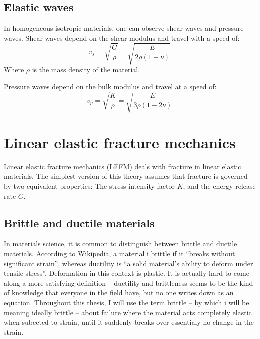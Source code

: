 \subsection{Elastic waves}
In homogeneous isotropic materials, one can observe shear waves and pressure waves. Shear waves depend on the shear modulus and travel with a speed of:
\begin{equation}
	v_s = \sqrt{\frac{G}{\rho}} = \sqrt{\frac{E}{2\rho(1+\nu)}}
\end{equation}
Where $\rho$ is the mass density of the material.

Pressure waves depend on the bulk modulus and travel at a speed of:
\begin{equation}
	v_p = \sqrt{\frac{K}{\rho}} = \sqrt{\frac{E}{3\rho(1-2\nu)}}
\end{equation}

\section{Linear elastic fracture mechanics}
Linear elastic fracture mechanics (LEFM) deals with fracture in linear elastic materials. The simplest version of this theory assumes that fracture is governed by two equivalent properties: The stress intensity factor $K$, and the energy release rate $G$.

\subsection{Brittle and ductile materials}
In materials science, it is common to distinguish between brittle and ductile materials. According to Wikipedia, a material i brittle if it ``breaks without significant strain'', whereas ductility is ``a solid material's ability to deform under tensile stress''. Deformation in this context is plastic. It is actually hard to come along a more satisfying definition -- ductility and brittleness seems to be the kind of knowledge that everyone in the field have, but no one writes down as an equation. Throughout this thesis, I will use the term brittle -- by which i will be meaning ideally brittle -- about failure where the material acts completely elastic when subected to strain, until it suddenly breaks over essentialy no change in the strain.

